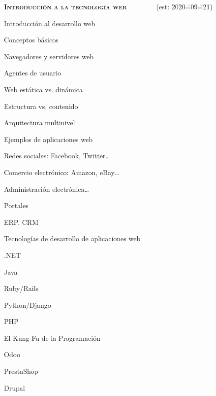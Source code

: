 \begin{longenum}
    \item \textbf{\textsc{Introducción a la tecnología web}} \ \ \ \ \ \ \ \ (est: 2020\==09\==21)
    \begin{longenum}
        \item Introducción al desarrollo web
        \begin{longenum}
            \item Conceptos básicos
            \begin{longenum}
                \item Navegadores y servidores web
                \item Agentes de usuario
                \item Web estática vs. dinámica
                \item Estructura vs. contenido
                \item Arquitectura multinivel
            \end{longenum}
            \item Ejemplos de aplicaciones web
            \begin{longenum}
                \item Redes sociales: Facebook, Twitter…
                \item Comercio electrónico: Amazon, eBay…
                \item Administración electrónica…
                \item Portales
                \item ERP, CRM
            \end{longenum}
            \item Tecnologías de desarrollo de aplicaciones web
            \begin{longenum}
                \item .NET
                \item Java
                \item Ruby/Rails
                \item Python/Django
                \item PHP
                \item El Kung-Fu de la Programación
                \begin{longenum}
                    \item Odoo
                    \item PrestaShop
                    \item Drupal

\end{longenum}
\end{longenum}
\end{longenum}
\end{longenum}
\end{longenum}

